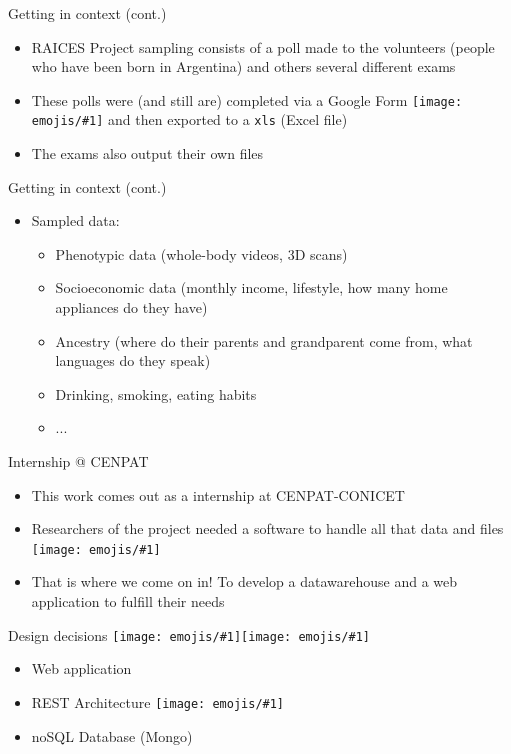 \documentclass{beamer}
\newcommand{\emoji}[1]{\texttt{[image: emojis/\#1]}}
\begin{document}
\begin{frame}[fragile]{Getting in context (cont.)}
    \begin{itemize}
        \item RAICES Project sampling consists of a poll made to the volunteers (people who have been born in Argentina) and others several different exams
        \item These polls were (and still are) completed via a Google Form \emoji{eyes.png} and then exported to a \texttt{xls} (Excel file) 
        \item The exams also output their own files
    \end{itemize}
\end{frame}

\begin{frame}[fragile]{Getting in context (cont.)}
    \begin{itemize}
        \item Sampled data:
        \begin{itemize}
            \item Phenotypic data (whole-body videos, 3D scans)
            \item Socioeconomic data (monthly income, lifestyle, how many home appliances do they have)
            \item Ancestry (where do their parents and grandparent come from, what languages do they speak)
            \item Drinking, smoking, eating habits
            \item ...
        \end{itemize}
    \end{itemize}
\end{frame}

\begin{frame}[fragile]{Internship @ CENPAT}
    \begin{itemize}
        \item This work comes out as a internship at CENPAT-CONICET
        \item Researchers of the project needed a software to handle all that data and files \emoji{scream.png}
        \item That is where we come on in! To develop a datawarehouse and a web application to fulfill their needs
    \end{itemize}
\end{frame}

\begin{frame}[fragile]{Design decisions \emoji{straight_ruler.png}\emoji{triangular_ruler.png}}
    \begin{itemize}
        \item Web application
        \item REST Architecture \emoji{construction.png}
        \item noSQL Database (Mongo)
    \end{itemize}
\end{frame}
\end{document}
